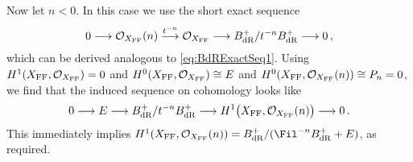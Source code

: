 \begin{proof*}
	Now let $n<0$. In this case we use the short exact sequence
	\begin{equation}\label{eq:BdRExactSeq3}
		0\morphism \Oo_{X_\FFC}(n)\morphism[t^{-n}]\Oo_{X_\FFC}\morphism B_\dR^+/t^{-n}B_\dR^+\morphism 0\,,
	\end{equation}
	which can be derived analogous to \cref{eq:BdRExactSeq1}. Using $H^1(X_{\mathrm{FF}},\mathcal{O}_{X_{\mathrm{FF}}})=0$ and $H^0(X_{\mathrm{FF}},\mathcal{O}_{X_{\mathrm{FF}}})\cong E$ and $H^0(X_{\mathrm{FF}},\mathcal{O}_{X_{\mathrm{FF}}}(n))\cong P_n=0$, we find that the induced sequence on cohomology looks like
	\begin{equation*}
		0\morphism E\morphism B_\dR^+/t^{-n}B_\dR^+\morphism H^1\big(X_\FFC,\Oo_{X_\FFC}(n)\big)\morphism 0\,.
	\end{equation*}
	This immediately implies $H^1(X_\FFC,\Oo_{X_\FFC}(n))=B_\dR^+/(\Fil^{-n}B_\dR^++E)$, as required.
\end{proof*}

